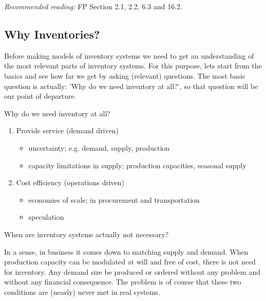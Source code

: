 

\textit{Recommended reading:} FP Section 2.1, 2.2, 6.3 and 16.2. 

\subsection{Why Inventories?}

Before making models of inventory systems we need to get an
understanding of the most relevant parts of inventory systems. For
this purpose, lets start from the basics and see how far we get by
asking (relevant) questions. The most basic question is actually:
'Why do we need inventory at all?', so that question will be our point
of departure.

\begin{question}
  Why do we need inventory at all?
\end{question}


\begin{solution}
\begin{enumerate}
\item Provide service (demand driven)
\begin{itemize}
\item uncertainty; e.g. demand, supply, production
\item capacity limitations in supply; production capacities, seasonal supply
\end{itemize}
\item Cost efficiency (operations driven)
\begin{itemize}
\item economies of scale; in procurement and transportation
\item speculation
\end{itemize}
\end{enumerate}
\end{solution}

\begin{question}
  When are inventory systems actually not necessary?
\end{question}

\begin{solution}
  In a sense, in business it comes down to matching supply and
  demand. When production capacity can be modulated at will and free of cost,
  there is not need for inventory. Any demand size be produced or
  ordered without any problem and without any financial consequence. The problem is of course that these two conditions are (nearly)
  never met in real systems.
\end{solution}


